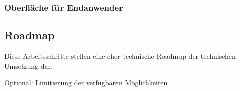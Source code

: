 \subsubsection{Oberfläche für Endanwender}

\subsection{Roadmap}

Diese Arbeitsschritte stellen eine eher technische Roadmap der technischen Umsetzung dar.

\begin{description}

\item[Optional: Limitierung der verfügbaren Möglichkeiten] \hfill
\end{description}

